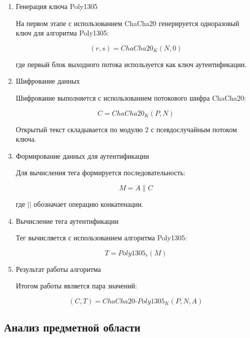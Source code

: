 \documentclass[14pt, a4paper]{extarticle}
\begin{document}
	\begin{enumerate}
	
	\item Генерация ключа Poly1305
	
	На первом этапе с использованием ChaCha20 генерируется одноразовый ключ для алгоритма Poly1305:
	
	\begin{equation}
		(r, s) = ChaCha20_K(N, 0)
	\end{equation}
	
	где первый блок выходного потока используется как ключ аутентификации.
	
	\item Шифрование данных
	
	Шифрование выполняется с использованием потокового шифра ChaCha20:
	
	\begin{equation}
		C = ChaCha20_K(P, N)
	\end{equation}
	
	Открытый текст складывается по модулю 2 с псевдослучайным потоком ключа.
	
	\item Формирование данных для аутентификации
	
	Для вычисления тега формируется последовательность:
	
	\begin{equation}
		M = A \parallel C
	\end{equation}
	
	где $||$ обозначает операцию конкатенации.
	
	\item Вычисление тега аутентификации
	
	Тег вычисляется с использованием алгоритма Poly1305:
	
	\begin{equation}
		T = Poly1305_{r}(M)
	\end{equation}
	
	\item Результат работы алгоритма
	
	Итогом работы является пара значений:
	
	\begin{equation}
		(C, T) = ChaCha20\text{-}Poly1305_K(P, N, A)
	\end{equation}
	
	\end{enumerate}
	
	\subsection{Анализ предметной области}
	
\end{document}
